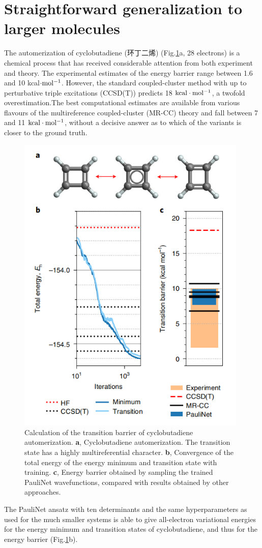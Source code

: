 \documentclass[12pt]{article}
\begin{document}
\section{\large Straightforward generalization to larger molecules}
The automerization of cyclobutadiene (环丁二烯) (Fig.\ref{img6}a, 28 electrons) is a chemical 
process that has received considerable attention from both experiment and theory.
The experimental estimates of the energy barrier range between 1.6 and 10 
kcal$\cdot\rm mol^{-1}$. However, the standard coupled-cluster method with up to 
perturbative triple excitations (CCSD(T)) predicts 18 $\rm kcal\cdot mol^{-1}$, a twofold 
overestimation.The best computational estimates are available from various flavours 
of the multireference coupled-cluster (MR-CC) theory and fall between 7 and 
11 $\rm kcal\cdot mol^{-1}$, without a decisive answer as to which of the variants is 
closer to the ground truth.
\begin{figure}[H]
    \centering
    \includegraphics[width=11cm]{p6.png}
    \renewcommand{\figurename}{Fig.}
    \caption{Calculation of the transition barrier of cyclobutadiene automerization. 
    \textbf{a}, Cyclobutadiene automerization. The transition state has a highly 
    multireferential character. \textbf{b}, Convergence of the total energy of the 
    energy minimum and transition state with training. \textbf{c}, Energy barrier 
    obtained by sampling the trained PauliNet wavefunctions, compared with results 
    obtained by other approaches.}
    \label{img6}
\end{figure}

The PauliNet ansatz with ten determinants and the same hyperparameters as used 
for the much smaller systems is able to give all-electron variational energies for the 
energy minimum and transition states of cyclobutadiene, and thus for the energy 
barrier (Fig.\ref{img6}b).
\end{document}
